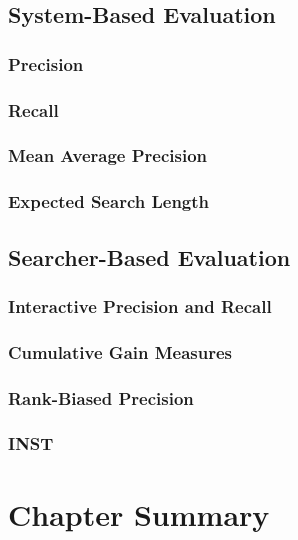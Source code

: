 \subsection{System-Based Evaluation}\label{sec:ir_background:evaluation:system}

\subsubsection{Precision}

\subsubsection{Recall}

\subsubsection{Mean Average Precision}

\subsubsection{Expected Search Length}

\subsection{Searcher-Based Evaluation}

\subsubsection{Interactive Precision and Recall}

\subsubsection{Cumulative Gain Measures}

\subsubsection{Rank-Biased Precision}

\subsubsection{INST}

\section{Chapter Summary}